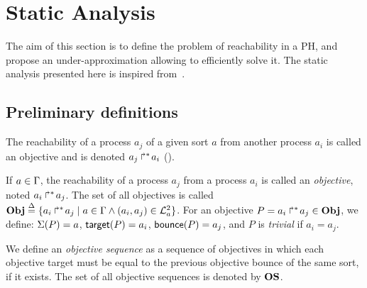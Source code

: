 \section{Static Analysis}\label{sec:sa}

The aim of this section is to define the problem of reachability in a PH,
and propose an under-approximation allowing to efficiently solve it.
The static analysis presented here is inspired from~\cite{PMR12-MSCS}.

\subsection{Preliminary definitions}
\label{ssec:sa-def}

The reachability of a process $a_j$ of a given sort $a$ from another process $a_i$ is called an objective and is denoted $\mbox{${a}_{j}\Rsh^*\!{a}_{i}$}$ ().
\begin{definition}
\label{def:obj}
  If $a \in \Gamma$, the reachability of a process $a_j$ from a process $a_i$ is called an \emph{objective}, noted $\mbox{$a_i\Rsh^*\!a_j$}$.
  The set of all objectives is called $\mathbf{Obj} \stackrel{\Delta}= \{ \mbox{$a_i\Rsh^*\!a_j$} \mid a \in \Gamma \wedge (a_i, a_j) \in \mathcal{L}_a^2 \}$.
  For an objective $P = \mbox{$a_i\Rsh^*\!a_j$} \in \mathbf{Obj}$, we define: $\Sigma(P) = a$, $\mathsf{target}(P)=a_i$, $\mathsf{bounce}(P)=a_j$,
  and $P$ is \emph{trivial} if $a_i = a_j$.

  We define an \emph{objective sequence} as a sequence of objectives in which each objective target must be equal to the previous objective bounce of the same sort, if it exists.
  The set of all objective sequences is denoted by $\mathbf{OS}$.
\end{definition}

